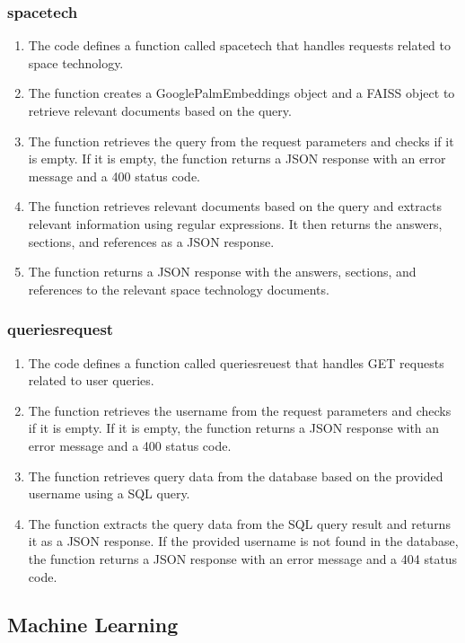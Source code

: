 \documentclass[11pt]{article}
\begin{document}
\subsubsection{spacetech}
\begin{enumerate}
	\item The code defines a function called spacetech that handles requests related to space technology.
	\item The function creates a GooglePalmEmbeddings object and a FAISS object to retrieve relevant documents based on the query.
	\item The function retrieves the query from the request parameters and checks if it is empty. If it is empty, the function returns a JSON response with an error message and a 400 status code.
	\item The function retrieves relevant documents based on the query and extracts relevant information using regular expressions. It then returns the answers, sections, and references as a JSON response.
	\item The function returns a JSON response with the answers, sections, and references to the relevant space technology documents.
\end{enumerate}

\subsubsection{queriesrequest}

\begin{enumerate}
	\item The code defines a function called queriesreuest that handles GET requests related to user queries.
	\item The function retrieves the username from the request parameters and checks if it is empty. If it is empty, the function returns a JSON response with an error message and a 400 status code.
	\item The function retrieves query data from the database based on the provided username using a SQL query.
	\item The function extracts the query data from the SQL query result and returns it as a JSON response.
	      If the provided username is not found in the database, the function returns a JSON response with an error message and a 404 status code.
\end{enumerate}

\subsection{Machine Learning}
\end{document}
